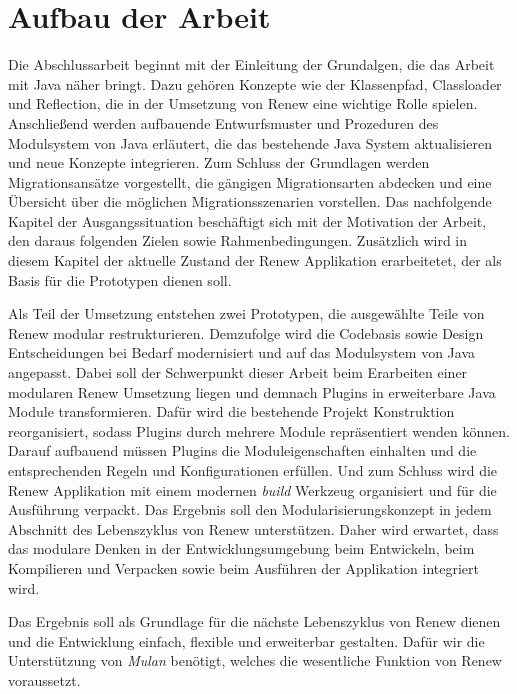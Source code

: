 \section{Aufbau der Arbeit} \label{sec:AdA}
	Die Abschlussarbeit beginnt mit der Einleitung der Grundalgen, die das Arbeit mit Java näher bringt. Dazu gehören Konzepte wie der Klassenpfad, Classloader und Reflection, die in der Umsetzung von Renew eine wichtige Rolle spielen. Anschließend werden aufbauende Entwurfsmuster und Prozeduren des Modulsystem von Java erläutert, die das bestehende Java System aktualisieren und neue Konzepte integrieren. Zum Schluss der Grundlagen werden Migrationsansätze vorgestellt, die gängigen Migrationsarten abdecken und eine Übersicht über die möglichen Migrationsszenarien vorstellen.\newline 
	Das nachfolgende Kapitel der Ausgangssituation beschäftigt sich mit der Motivation der Arbeit, den daraus folgenden Zielen sowie Rahmenbedingungen. Zusätzlich wird in diesem Kapitel der aktuelle Zustand der Renew Applikation erarbeitetet, der als Basis für die Prototypen dienen soll. \bigbreak 

	Als Teil der Umsetzung entstehen zwei Prototypen, die ausgewählte Teile von Renew modular restrukturieren. Demzufolge wird die Codebasis sowie Design Entscheidungen bei Bedarf modernisiert und auf das Modulsystem von Java angepasst. Dabei soll der Schwerpunkt dieser Arbeit beim Erarbeiten einer modularen Renew Umsetzung liegen und demnach Plugins in erweiterbare Java Module transformieren.\newline
	Dafür wird die bestehende Projekt Konstruktion reorganisiert, sodass Plugins durch mehrere Module repräsentiert wenden können. Darauf aufbauend müssen Plugins die Moduleigenschaften einhalten und die entsprechenden Regeln und Konfigurationen erfüllen. Und zum Schluss wird die Renew Applikation mit einem modernen \textit{build} Werkzeug organisiert und für die Ausführung verpackt.\newline
	Das Ergebnis soll den Modularisierungskonzept in jedem Abschnitt des Lebenszyklus von Renew unterstützen. Daher wird erwartet, dass das modulare Denken in der Entwicklungsumgebung beim Entwickeln, beim Kompilieren und Verpacken sowie beim Ausführen der Applikation integriert wird. \bigbreak

	Das Ergebnis soll als Grundlage für die nächste Lebenszyklus von Renew dienen und die Entwicklung einfach, flexible und erweiterbar gestalten. Dafür wir die Unterstützung von \textit{Mulan} benötigt, welches die wesentliche Funktion von Renew voraussetzt. 

